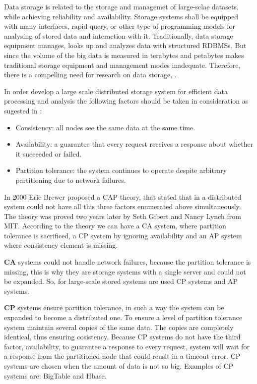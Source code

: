 Data storage is related to the storage and managemet of large-sclae datasets, while achieving reliability and availability. Storage systems shall be equipped with many interfaces, rapid query, or other type of programming models for analysing of stored data and interaction with it. Traditionally, data storage equipment manages, looks up and analyzes data with structured RDBMSs. But since the volume of the big data is measured in terabytes and petabytes makes traditional storage equipment and management modes inadequate. Therefore, there is a compelling need for research on data storage, \cite{bdtech}.

In order develop a large scale distributed storage system for  efficient data processing and analysis the following factors should be taken in consideration as sugested in \cite{CAP}:

\begin{itemize}

\item Consistency: all nodes see the same data at the same time.
\item Availability: a guarantee that every request receives a response about whether it succeeded or failed.
\item Partition tolerance: the system continues to operate despite arbitrary partitioning due to network failures.

\end{itemize}

In 2000 Eric Brewer proposed a CAP theory, that stated that in a distributed system could not have all this three factors enumerated above simultaneously. The theory was proved two years later by Seth Gibert and Nancy Lynch from MIT. According to the theory we can have a CA system, where partition tolerance is sacrificed, a CP system by ignoring availability and an AP system where consistency element is missing.

\textbf{CA} systems could not handle network failures, because the partition tolerance is missing, this is why they are storage systems with a single server and could not be expanded. So, for large-scale stored systems are used CP systems and AP systems. 

\textbf{CP} systems ensure partition tolerance, in such a way the system can be expanded to become a distributed one. To ensure a level of partition tolerance system maintain several copies of the same data. The copies are completely identical, thus ensuring cosistency. Because CP systems do not have the third factor, availability, to guarantee a response to every request, system will wait for a response from the partitioned node that could reuslt in a timeout error. CP systems are chosen when the amount of data is not so big. Examples of CP systems are: BigTable and Hbase.

